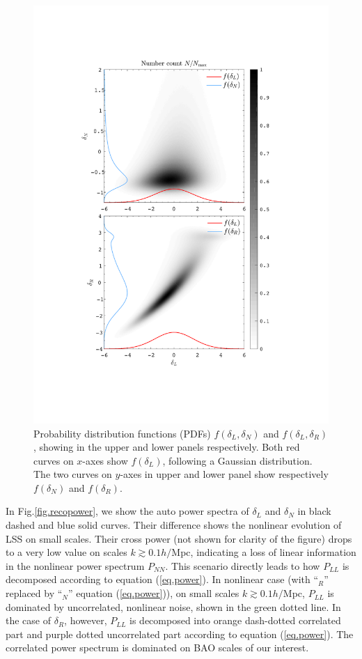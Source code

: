 \documentclass[aps,prd,twocolumn,superscriptaddress,amsfont,amssymb,amsmath,nofootinbib,showpacs,balancelastpage]{revtex4-1}
\begin{document}
\begin{figure}[t] \centering
  \includegraphics[width=1.0\linewidth]{pdfs.pdf}
  \caption{Probability distribution functions (PDFs)
  $f(\delta_L,\delta_N)$ and $f(\delta_L,\delta_R)$, showing in the upper
  and lower panels respectively. Both red curves on $x$-axes show $f(\delta_L)$, following
  a Gaussian distribution. The two curves on $y$-axes in upper and lower panel
  show respectively $f(\delta_N)$ and $f(\delta_R)$.}
  \label{fig.pdfs}
\end{figure}

In Fig.\ref{fig.recopower}, we show the auto power spectra of
$\delta_L$ and $\delta_N$ in black dashed and blue solid curves.
Their difference shows the nonlinear evolution of LSS on 
small scales. Their cross power (not shown for clarity of the figure)
drops to a very low value on scales $k\gtrsim 0.1h/$Mpc,
indicating a loss of linear information in the
nonlinear power spectrum $P_{NN}$. This scenario directly
leads to how $P_{LL}$ is decomposed according to equation
(\ref{eq.power}). In nonlinear case (with ``$_R$'' replaced
by ``$_N$'' equation (\ref{eq.power})), on small
scales $k\gtrsim 0.1h/$Mpc, $P_{LL}$ is dominated by
uncorrelated, nonlinear noise, shown in the green
dotted line. In the case of $\delta_R$, however, $P_{LL}$
is decomposed into orange dash-dotted correlated
part and purple dotted uncorrelated part according to
equation (\ref{eq.power}). The correlated power spectrum
is dominated on BAO scales of our interest.
\end{document}
